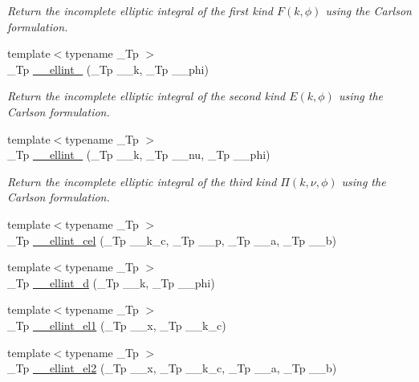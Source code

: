 \begin{DoxyCompactItemize}
\begin{DoxyCompactList}\small\item\em Return the incomplete elliptic integral of the first kind $ F(k,\phi) $ using the Carlson formulation. \end{DoxyCompactList}\item 
{\footnotesize template$<$typename \+\_\+\+Tp $>$ }\\\+\_\+\+Tp \hyperlink{namespacestd_1_1____detail_ad3687a38e74e5fbf08265501add0b56a}{\+\_\+\+\_\+ellint\+\_} (\+\_\+\+Tp \+\_\+\+\_\+k, \+\_\+\+Tp \+\_\+\+\_\+phi)
\begin{DoxyCompactList}\small\item\em Return the incomplete elliptic integral of the second kind $ E(k,\phi) $ using the Carlson formulation. \end{DoxyCompactList}\item 
{\footnotesize template$<$typename \+\_\+\+Tp $>$ }\\\+\_\+\+Tp \hyperlink{namespacestd_1_1____detail_a9c6ea96cd5d6907fce278010b992499a}{\+\_\+\+\_\+ellint\+\_} (\+\_\+\+Tp \+\_\+\+\_\+k, \+\_\+\+Tp \+\_\+\+\_\+nu, \+\_\+\+Tp \+\_\+\+\_\+phi)
\begin{DoxyCompactList}\small\item\em Return the incomplete elliptic integral of the third kind $ \Pi(k,\nu,\phi) $ using the Carlson formulation. \end{DoxyCompactList}\item 
{\footnotesize template$<$typename \+\_\+\+Tp $>$ }\\\+\_\+\+Tp \hyperlink{namespacestd_1_1____detail_a7c7d04715f0d40e054299312db35e32d}{\+\_\+\+\_\+ellint\+\_\+cel} (\+\_\+\+Tp \+\_\+\+\_\+k\+\_\+c, \+\_\+\+Tp \+\_\+\+\_\+p, \+\_\+\+Tp \+\_\+\+\_\+a, \+\_\+\+Tp \+\_\+\+\_\+b)
\item 
{\footnotesize template$<$typename \+\_\+\+Tp $>$ }\\\+\_\+\+Tp \hyperlink{namespacestd_1_1____detail_a00da42d89830fd51e9934fe0c5e08b7f}{\+\_\+\+\_\+ellint\+\_\+d} (\+\_\+\+Tp \+\_\+\+\_\+k, \+\_\+\+Tp \+\_\+\+\_\+phi)
\item 
{\footnotesize template$<$typename \+\_\+\+Tp $>$ }\\\+\_\+\+Tp \hyperlink{namespacestd_1_1____detail_aa17b1b382a89552f49fbb8c5eda1d50f}{\+\_\+\+\_\+ellint\+\_\+el1} (\+\_\+\+Tp \+\_\+\+\_\+x, \+\_\+\+Tp \+\_\+\+\_\+k\+\_\+c)
\item 
{\footnotesize template$<$typename \+\_\+\+Tp $>$ }\\\+\_\+\+Tp \hyperlink{namespacestd_1_1____detail_a82449d0f05d40ba2cef6b8fc57dd5bae}{\+\_\+\+\_\+ellint\+\_\+el2} (\+\_\+\+Tp \+\_\+\+\_\+x, \+\_\+\+Tp \+\_\+\+\_\+k\+\_\+c, \+\_\+\+Tp \+\_\+\+\_\+a, \+\_\+\+Tp \+\_\+\+\_\+b)

\end{DoxyCompactItemize}
